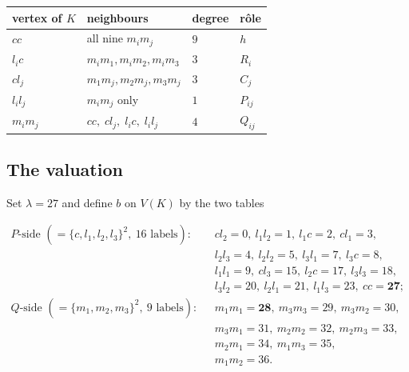 \documentclass[11pt]{amsart}
\theoremstyle{definition}
\theoremstyle{remark}
\begin{document}
\begin{center}
\begin{tabular}{llll}
\hline
vertex of $K$ & neighbours & degree & r\^ole\\
\hline
$cc$        & all nine $m_im_j$ & $9$ & $h$\\
$l_ic$      & $m_im_1,m_im_2,m_im_3$ & $3$ & $R_i$\\
$cl_j$      & $m_1m_j,m_2m_j,m_3m_j$ & $3$ & $C_j$\\
$l_il_j$    & $m_im_j$ only & $1$ & $P_{ij}$\\
$m_im_j$    & $cc,\;cl_j,\;l_ic,\;l_il_j$ & $4$ & $Q_{ij}$\\
\hline
\end{tabular}
\end{center}

\subsection*{The valuation}
Set $\lambda=27$ and define $b$ on $V(K)$ by the two tables

\begin{align*}
 P\text{-side } (=\{c,l_1,l_2,l_3\}^2,\ 16 \text{ labels}):\quad
 & cl_2=0,\ l_1l_2=1,\ l_1c=2,\ cl_1=3,\\
 & l_2l_3=4,\ l_2l_2=5,\ l_3l_1=7,\ l_3c=8,\\
 & l_1l_1=9,\ cl_3=15,\ l_2c=17,\ l_3l_3=18,\\
 & l_3l_2=20,\ l_2l_1=21,\ l_1l_3=23,\ cc=\mathbf{27};\\[2pt]
 Q\text{-side } (=\{m_1,m_2,m_3\}^2,\ 9 \text{ labels}):\quad
 & m_1m_1=\mathbf{28},\ m_3m_3=29,\ m_3m_2=30,\\
 & m_3m_1=31,\ m_2m_2=32,\ m_2m_3=33,\\
 & m_2m_1=34,\ m_1m_3=35,\\
 & m_1m_2=36.
\end{align*}
\end{document}
